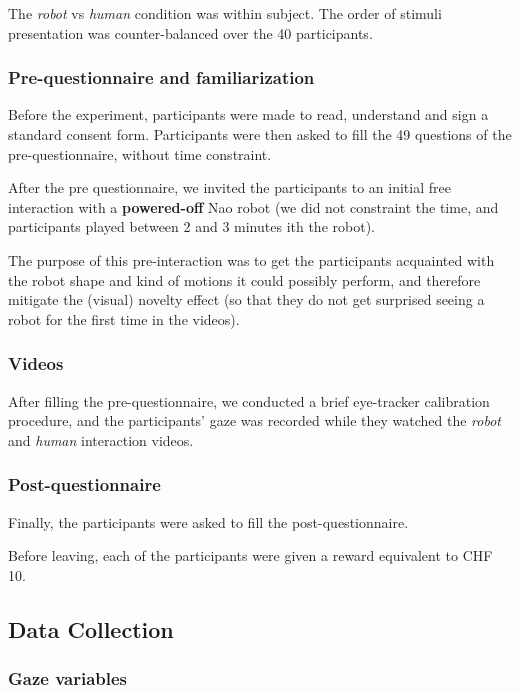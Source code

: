 \documentclass[a4,twocolumn,10pt]{article}
\begin{document}
The \emph{robot} vs \emph{human} condition was within subject. The order of
stimuli presentation was counter-balanced over the 40 participants.

\subsubsection{Pre-questionnaire and familiarization}

Before the experiment, participants were made to read, understand and sign a
standard consent form. Participants were then asked to fill the 49 questions of
the pre-questionnaire, without time constraint.

After the pre questionnaire, we invited the participants to an initial
free interaction with a \textbf{powered-off} Nao robot (we did not constraint
the time, and participants played between 2 and 3 minutes ith the robot).

The purpose of this pre-interaction was to get the participants acquainted with the
robot shape and kind of motions it could possibly perform, and therefore
mitigate the (visual) novelty effect (so that they do not get surprised seeing
a robot for the first time in the videos).

\subsubsection{Videos}

After filling the pre-questionnaire, we conducted a brief eye-tracker
calibration procedure, and the participants' gaze was recorded while they
watched the \emph{robot} and \emph{human} interaction videos.

\subsubsection{Post-questionnaire}

Finally, the participants were asked to fill the post-questionnaire.

Before leaving, each of the participants were given a reward equivalent to CHF
10.

\subsection{Data Collection}

\subsubsection{Gaze variables}
\end{document}
